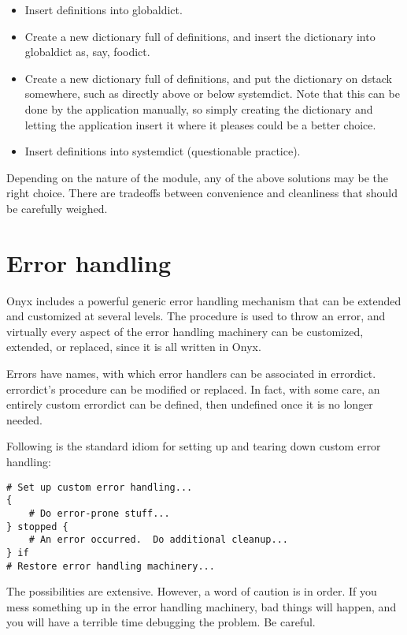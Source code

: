 \begin{itemize}
\item{Insert definitions into globaldict.}
\item{Create a new dictionary full of definitions, and insert the dictionary
  into globaldict as, say, foodict.}
\item{Create a new dictionary full of definitions, and put the dictionary on
  dstack somewhere, such as directly above or below systemdict.  Note that this
  can be done by the application manually, so simply creating the dictionary and
  letting the application insert it where it pleases could be a better choice.}
\item{Insert definitions into systemdict (questionable practice).}
\end{itemize}

Depending on the nature of the module, any of the above solutions may be the
right choice.  There are tradeoffs between convenience and cleanliness that
should be carefully weighed.

\section{Error handling}
Onyx includes a powerful generic error handling mechanism that can be extended
and customized at several levels.  The
 procedure is used to throw an
error, and virtually every aspect of the error handling machinery can be
customized, extended, or replaced, since it is all written in Onyx.

Errors have names, with which error handlers can be associated in errordict.
errordict's  procedure
can be modified or replaced.  In fact, with some care, an entirely custom
errordict can be defined, then undefined once it is no longer needed.

Following is the standard idiom for setting up and tearing down custom error
handling:

\begin{verbatim}
# Set up custom error handling...
{
    # Do error-prone stuff...
} stopped {
    # An error occurred.  Do additional cleanup...
} if
# Restore error handling machinery...
\end{verbatim}

The possibilities are extensive.  However, a word of caution is in order.  If
you mess something up in the error handling machinery, bad things will happen,
and you will have a terrible time debugging the problem.  Be careful.

